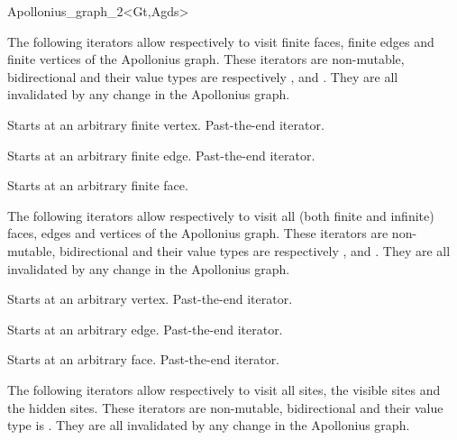 \begin{ccRefClass}{Apollonius_graph_2<Gt,Agds>}


The following iterators allow respectively to visit 
finite faces,  finite edges and  finite vertices
of the Apollonius graph. These iterators are non-mutable,
bidirectional and their value types are respectively
,  and . 
They are all invalidated by any change in the Apollonius graph.

{Starts at an arbitrary finite vertex.}
\ccGlue
{}
{Past-the-end iterator.}

{Starts at an arbitrary finite edge.}
\ccGlue
{}
{Past-the-end iterator.}

{Starts at an arbitrary finite face.}
\ccGlue
{}

The following iterators allow respectively to visit all
(both finite and infinite) faces, edges and vertices
of the Apollonius graph. These iterators are non-mutable, bidirectional
and their value types are respectively
,  and . 
They are all invalidated by any change in the Apollonius graph.


{Starts at an arbitrary  vertex.}
\ccGlue
{}
{Past-the-end iterator.}

{Starts at an arbitrary edge.}
\ccGlue
{}
{Past-the-end iterator.}

{Starts at an arbitrary face.}
\ccGlue
{}
{Past-the-end iterator.}




The following iterators allow respectively to visit 
all sites, the visible sites and the hidden sites.
These iterators are non-mutable, bidirectional and their value type
is . They are all invalidated by any change in the
Apollonius graph.



\end{ccRefClass}
